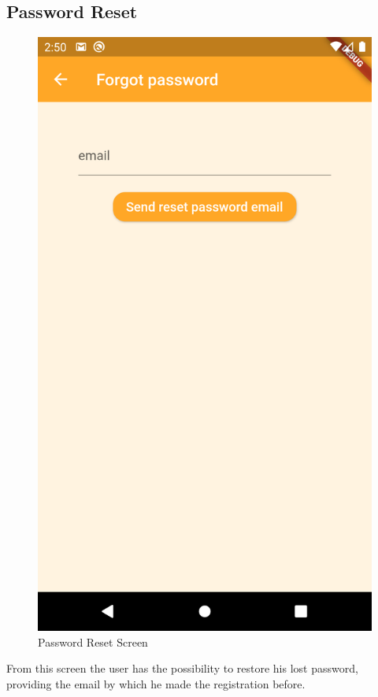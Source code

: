 \subsection{Password Reset}
\begin{figure}[H]
	\centering
	\includegraphics{img/PasswordReset.png}
	\caption{Password Reset Screen}
\end{figure}
From this screen the user has the possibility to restore his lost password, providing the email by which he made the registration before.
